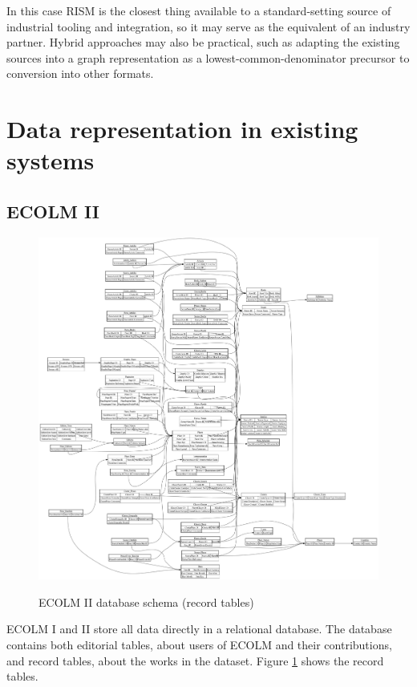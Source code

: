 \documentclass[sigconf, nonacm=true]{acmart}
\begin{document}
\begin{sloppypar}
  In this case RISM is the closest thing available to a
  standard-setting source of industrial tooling and integration, so it
  may serve as the equivalent of an industry partner. Hybrid
  approaches may also be practical, such as adapting the existing
  sources into a graph representation as a lowest-common-denominator
  precursor to conversion into other formats.
  
  \clearpage

  \section{Data representation in existing systems}
  
  \subsection{ECOLM II}\label{ecolm-data}
  
  \begin{figure}[b]
  \centering
  \caption{ECOLM II database schema (record tables)}
  \includegraphics[width=\textwidth]{plot/records}
  \label{fig:records}
  \end{figure}

  ECOLM I and II store all data directly in a relational database. The
  database contains both editorial tables, about users of ECOLM and
  their contributions, and record tables, about the works in the
  dataset. Figure \ref{fig:records} shows the record tables.


\end{sloppypar}
\end{document}
